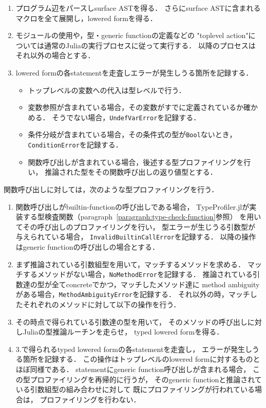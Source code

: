 \begin{enumerate}
  \item プログラム辺をパースしsurface ASTを得る．
        さらにsurface ASTに含まれるマクロを全て展開し，lowered formを得る．
  \item モジュールの使用や，型・generic functionの定義などの
        "toplevel action"については通常のJuliaの実行プロセスに従って実行する．
        以降のプロセスはそれ以外の場合とする．
  \item lowered formの各statementを走査しエラーが発生しうる箇所を記録する．
  \begin{itemize}
    \item トップレベルの変数への代入は型レベルで行う．
    \item 変数参照が含まれている場合，その変数がすでに定義されているか確かめる．
          そうでない場合，\verb|UndefVarError|を記録する．
    \item 条件分岐が含まれている場合，その条件式の型が\verb|Bool|ないとき，
          \verb|ConditionError|を記録する．
    \item 関数呼び出しが含まれている場合，後述する型プロファイリングを行い，
          推論された型をその関数呼び出しの返り値型とする．
  \end{itemize}
\end{enumerate}

関数呼び出しに対しては，次のような型プロファイリングを行う．

\begin{enumerate}
  \item 関数呼び出しがbuiltin-functionの呼び出しである場合，
        TypeProfiler.jlが実装する型検査関数（paragraph~\ref{paragraph:type-check-function}参照）
        を用いてその呼び出しのプロファイリングを行い，
        型エラーが生じうる引数型が与えられている場合，
        \verb|InvalidBuiltinCallError|を記録する．
        以降の操作はgeneric functionの呼び出しの場合とする．
  \item まず推論されている引数組型を用いて，マッチするメソッドを求める．
        マッチするメソッドがない場合，\verb|NoMethodError|を記録する．
        推論されている引数達の型が全てconcreteでかつ，マッチしたメソッド達に
        method ambiguityがある場合，\verb|MethodAmbiguityError|を記録する．
        それ以外の時，マッチしたそれぞれのメソッドに対して以下の操作を行う．
  \item その時点で得られている引数達の型を用いて，
        そのメソッドの呼び出しに対しJuliaの型推論ルーチンを走らせ，
        typed lowered formを得る．
  \item 3.で得られるtyped lowered formの各statementを走査し，
        エラーが発生しうる箇所を記録する．
        この操作はトップレベルのlowered formに対するものとほぼ同様である．
        statementにgeneric function呼び出しが含まれる場合，
        この型プロファイリングを再帰的に行うが，
        そのgeneric functionと推論されている引数組型の組み合わせに対して
        既にプロファイリングが行われている場合は，
        プロファイリングを行わない．
\end{enumerate}

